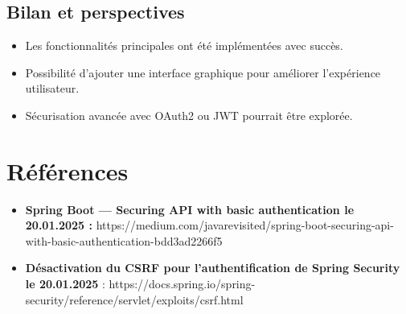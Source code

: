 \documentclass{article}
\begin{document}
\subsection{Bilan et perspectives}
\begin{itemize}
    \item Les fonctionnalités principales ont été implémentées avec succès.
    \item Possibilité d'ajouter une interface graphique pour améliorer l'expérience utilisateur.
    \item Sécurisation avancée avec OAuth2 ou JWT pourrait être explorée.
\end{itemize}

\section{Références}
\begin{itemize}
    \item\textbf{Spring Boot — Securing API with basic authentication le 20.01.2025 :} https://medium.com/javarevisited/spring-boot-securing-api-with-basic-authentication-bdd3ad2266f5
    \item\textbf{Désactivation du CSRF pour l'authentification de Spring Security le 20.01.2025} : https://docs.spring.io/spring-security/reference/servlet/exploits/csrf.html
\end{itemize}
\end{document}
